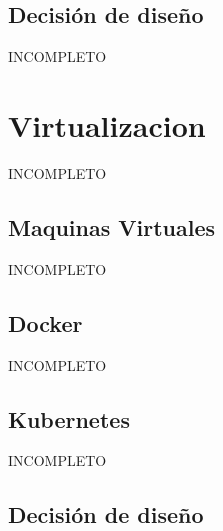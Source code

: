 \subsection{Decisión de diseño}
INCOMPLETO




\section{Virtualizacion}
INCOMPLETO
  \subsection{Maquinas Virtuales}
  INCOMPLETO
  \subsection{Docker}
  INCOMPLETO
  \subsection{Kubernetes}
  INCOMPLETO
\subsection{Decisión de diseño}

